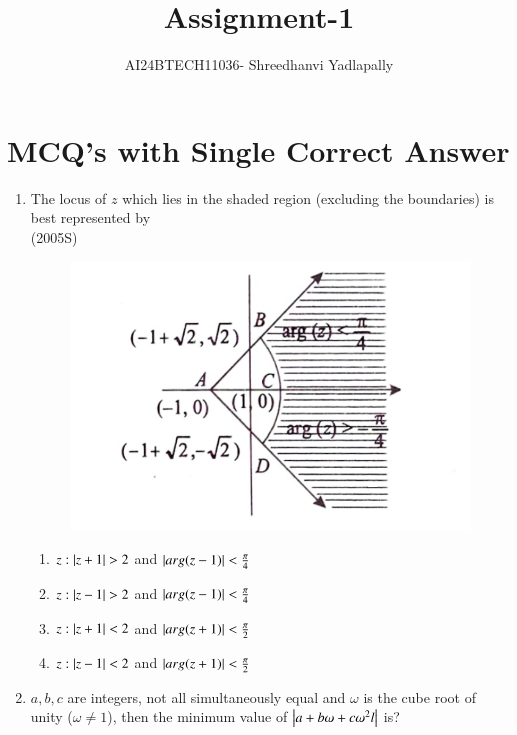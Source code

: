 \documentclass[journal,12pt,twocolumn]{IEEEtran}
\theoremstyle{remark}
\begin{document}

\vspace{3cm}

\title{Assignment-1}
\author{AI24BTECH11036- Shreedhanvi Yadlapally}
\maketitle
\newpage
\bigskip
\section{MCQ's with Single Correct Answer}
\begin{enumerate}
	\item The locus of $z$ which lies in the shaded region (excluding the boundaries) is best represented by
\\

\hfill{(2005S)}\\
	        \begin{figure}[ht]
\includegraphics[scale=0.2]{Figure/Screenshot_20240807-085214}
		\end{figure}
\begin{enumerate}[label=(\alph*)]
\item $z:\left\vert z+1\right\vert>2$ and  $\left\vert arg(z-1)\right\vert<\frac{\pi}{4}$
\item $z:\left\vert z-1\right\vert>2$ and $\left\vert arg(z-1)\right\vert<\frac{\pi}{4}$
\item $z:\left\vert z+1\right\vert<2$ and $\left\vert arg(z+1)\right\vert<\frac{\pi}{2}$
\item $z:\left\vert z-1\right\vert<2$ and $\left\vert arg(z+1)\right\vert<\frac{\pi}{2}$
\end{enumerate}

\item $a,b,c$ are integers, not all simultaneously equal and $\omega$ is the cube root of unity ($\omega \neq 1$), then the minimum value of $\left\vert a+b\omega+c\omega^{2}l\right\vert$ is?         \\


\end{enumerate}
\end{document}
